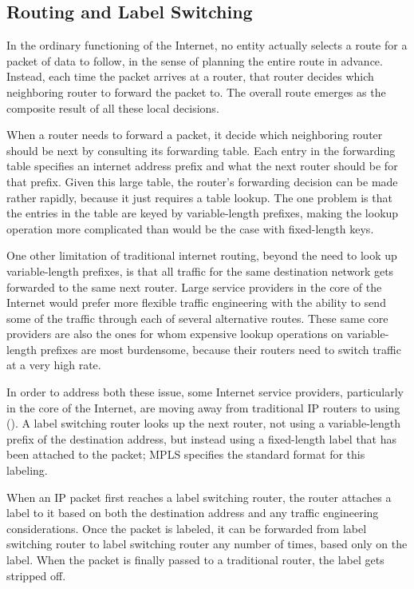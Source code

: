 \subsection{Routing and Label Switching}

In the ordinary functioning of the Internet, no entity actually
selects a route for a packet of data to follow, in the sense of
planning the entire route in advance.  Instead, each time the packet
arrives at a router, that router decides which neighboring router to
forward the packet to.  The overall route emerges as the composite
result of all these local decisions.

When a router needs to forward a packet, it decide which neighboring
router should be next by consulting its forwarding table.  Each entry
in the forwarding table specifies an internet address prefix and what
the next router should be for that prefix.  Given this large table,
the router's forwarding decision can be made rather rapidly, because it
just requires a table lookup.  The one problem is that the entries in
the table are keyed by variable-length prefixes, making the lookup
operation more complicated than would be the case with fixed-length
keys.

One other limitation of traditional internet routing, beyond the need
to look up variable-length prefixes, is that all traffic for the same
destination network gets forwarded to the same next router.  Large
service providers in the core of the Internet would prefer more
flexible traffic engineering with the ability to send some of the
traffic through each of several alternative routes.  These same core
providers are also the ones for whom expensive lookup operations on
variable-length prefixes are most burdensome, because their routers need
to switch traffic at a very high rate.

In order to address both these issue, some Internet service providers,
particularly in the core of the Internet, are moving away from
traditional IP routers to  using
 ().
A label switching router looks up the next router, not using a
variable-length prefix of the destination address, but instead using a
fixed-length label that has been attached to the packet; MPLS
specifies the standard format for this labeling.

When an IP packet first reaches a label switching router, the router
attaches a label to it based on both the destination address and any
traffic engineering considerations.  Once the packet is labeled, it
can be forwarded from label switching router to label switching router
any number of times, based only on the label.  When the packet is
finally passed to a traditional router, the label gets stripped off.

